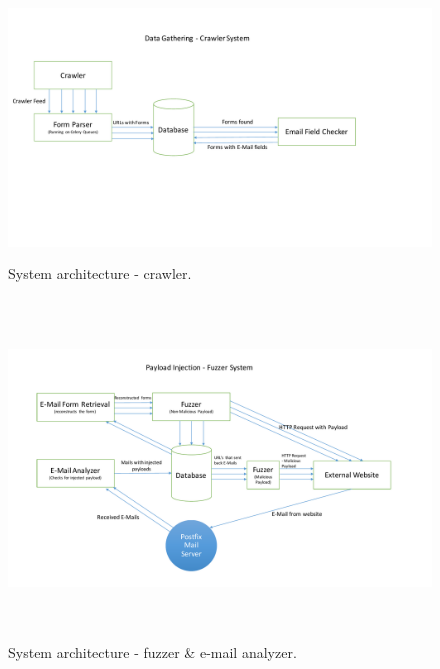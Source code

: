 \begin{figure}
	\centering
	\includegraphics[width=14cm, height=7cm]{System/crawler_design}
	\caption[]{System architecture - crawler.}
	\label{fig:crawler}
\end{figure}


\begin{figure}
	\centering
	\includegraphics[width=16cm, height=9cm]{System/fuzzer_design}
	\caption[]{System architecture - fuzzer {\&} e-mail analyzer.}
	\label{fig:fuzzer}
\end{figure}
